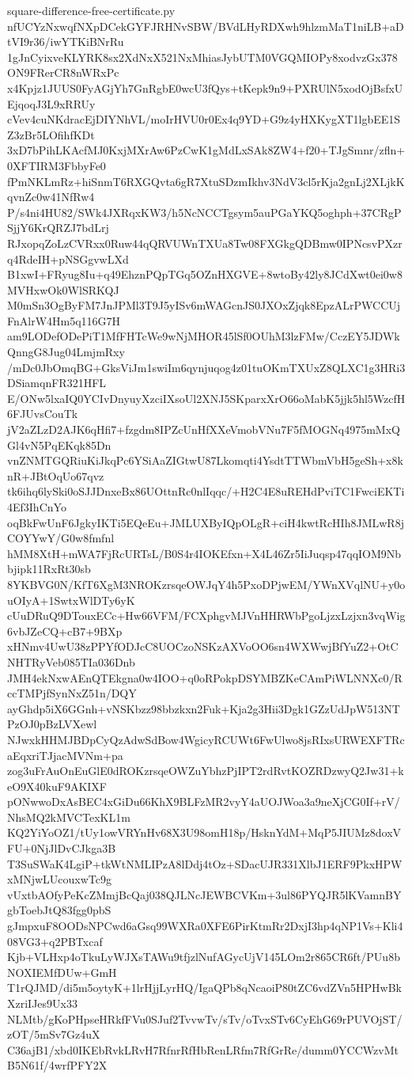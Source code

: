 \documentclass[11pt]{article}
\theoremstyle{definition}
\theoremstyle{remark}
\begin{document}
\begin{filecontents*}[overwrite]{square-difference-free-certificate.py}
nfUCYzNxwqfNXpDCekGYFJRHNvSBW/BVdLHyRDXwh9hlzmMaT1niLB+aDtVI9r36/iwYTKiBNrRu
1gJnCyixveKLYRK8sx2XdNxX521NxMhiasJybUTM0VGQMIOPy8xodvzGx378ON9FRerCR8nWRxPc
x4Kpjz1JUUS0FyAGjYh7GnRgbE0wcU3fQys+tKepk9n9+PXRUlN5xodOjBsfxUEjqoqJ3L9xRRUy
cVev4cuNKdracEjDIYNhVL/moIrHVU0r0Ex4q9YD+G9z4yHXKygXT1lgbEE1SZ3zBr5LOfihfKDt
3xD7bPihLKAcfMJ0KxjMXrAw6PzCwK1gMdLxSAk8ZW4+f20+TJgSmnr/zfln+0XFTIRM3FbbyFe0
fPmNKLmRz+hiSnmT6RXGQvta6gR7XtuSDzmIkhv3NdV3cl5rKja2gnLj2XLjkKqvnZc0w41NfRw4
P/s4ni4HU82/SWk4JXRqxKW3/h5NcNCCTgsym5auPGaYKQ5oghph+37CRgPSjjY6KrQRZJ7bdLrj
RJxopqZoLzCVRxx0Ruw44qQRVUWnTXUa8Tw08FXGkgQDBmw0IPNcsvPXzrq4RdeIH+pNSGgvwLXd
B1xwI+FRyug8Iu+q49EhznPQpTGq5OZnHXGVE+8wtoBy42ly8JCdXwt0ei0w8MVHxwOk0WlSRKQJ
M0mSn3OgByFM7JnJPMl3T9J5yISv6mWAGcnJS0JXOxZjqk8EpzALrPWCCUjFnAlrW4Hm5q116G7H
am9LODefODePiT1MfFHTcWe9wNjMHOR45lSf0OUhM3lzFMw/CczEY5JDWkQnngG8Jug04LmjmRxy
/mDc0JbOmqBG+GksViJm1swiIm6qynjuqog4z01tuOKmTXUxZ8QLXC1g3HRi3DSiamqnFR321HFL
E/ONw5lxaIQ0YCIvDnyuyXzciIXsoUl2XNJ5SKparxXrO66oMabK5jjk5hl5WzcfH6FJUvsCouTk
jV2aZLzD2AJK6qHfi7+fzgdm8IPZcUnHfXXeVmobVNu7F5fMOGNq4975mMxQGl4vN5PqEKqk85Dn
vnZNMTGQRiuKiJkqPc6YSiAaZIGtwU87Lkomqti4YsdtTTWbmVbH5geSh+x8knR+JBtOqUo67qvz
tk6ihq6lySki0oSJJDnxeBx86UOttnRc0nlIqqc/+H2C4E8uREHdPviTC1FwciEKTi4Ef3IhCnYo
oqBkFwUnF6JgkyIKTi5EQeEu+JMLUXByIQpOLgR+ciH4kwtRcHIh8JMLwR8jCOYYwY/G0w8fmfnl
hMM8XtH+mWA7FjRcURTsL/B0S4r4IOKEfxn+X4L46Zr5IiJuqsp47qqIOM9Nbbjipk11RxRt30sb
8YKBVG0N/KfT6XgM3NROKzrsqeOWJqY4h5PxoDPjwEM/YWnXVqlNU+y0ouOIyA+1SwtxWlDTy6yK
cUuDRuQ9DTouxECc+Hw66VFM/FCXphgvMJVnHHRWbPgoLjzxLzjxn3vqWig6vbJZeCQ+cB7+9BXp
xHNmv4UwU38zPPYfODJcC8UOCzoNSKzAXVoOO6sn4WXWwjBfYuZ2+OtCNHTRyVeb085TIa036Dnb
JMH4ekNxwAEnQTEkgna0w4IOO+q0oRPokpDSYMBZKeCAmPiWLNNXc0/RccTMPjfSynNxZ51n/DQY
ayGhdp5iX6GGnh+vNSKbzz98bbzkxn2Fuk+Kja2g3Hii3Dgk1GZzUdJpW513NTPzOJ0pBzLVXewl
NJwxkHHMJBDpCyQzAdwSdBow4WgicyRCUWt6FwUlwo8jsRIxsURWEXFTRcaEqxriTJjacMVNm+pa
zog3uFrAuOnEuGlE0dROKzrsqeOWZuYbhzPjIPT2rdRvtKOZRDzwyQ2Jw31+keO9X40kuF9AKIXF
pONwwoDxAsBEC4xGiDu66KhX9BLFzMR2vyY4aUOJWoa3a9neXjCG0If+rV/NhsMQ2kMVCTexKL1m
KQ2YiYoOZ1/tUy1owVRYnHv68X3U98omH18p/HsknYdM+MqP5JIUMz8doxVFU+0NjJlDvCJkga3B
T3SuSWaK4LgiP+tkWtNMLIPzA8lDdj4tOz+SDacUJR331XlbJ1ERF9PkxHPWxMNjwLUcouxwTc9g
vUxtbAOfyPeKcZMmjBcQaj038QJLNcJEWBCVKm+3ul86PYQJR5lKVamnBYgbToebJtQ83fgg0pbS
gJmpxuF8OODsNPCwd6aGsq99WXRa0XFE6PirKtmRr2DxjI3hp4qNP1Vs+Kli408VG3+q2PBTxcaf
Kjb+VLHxp4oTkuLyWJXsTAWu9tfjzlNufAGycUjV145LOm2r865CR6ft/PUu8bNOXIEMfDUw+GmH
T1rQJMD/di5m5oytyK+1lrHjjLyrHQ/IgaQPb8qNcaoiP80tZC6vdZVn5HPHwBkXzriIJes9Ux33
NLMtb/gKoPHpseHRkfFVu0SJuf2TvvwTv/sTv/oTvxSTv6CyEhG69rPUVOjST/zOT/5mSv7Gz4uX
C36ajB1/xbd0IKEbRvkLRvH7RfnrRfHbRenLRfm7RfGrRe/dumm0YCCWzvMtB5N61f/4wrfPFY2X

\end{filecontents*}
\end{document}
